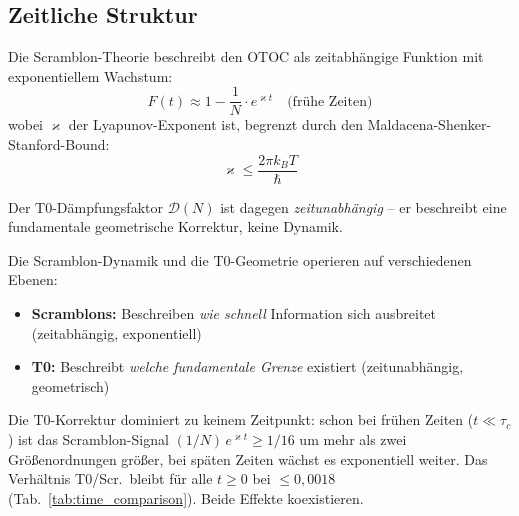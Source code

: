 \subsection{Zeitliche Struktur}

Die Scramblon-Theorie beschreibt den OTOC als zeitabhängige Funktion mit exponentiellem Wachstum:
\begin{equation}
	F(t) \approx 1 - \frac{1}{N} \cdot e^{\varkappa t} \quad \text{(frühe Zeiten)}
	\label{eq:otoc_scrambling}
\end{equation}
wobei $\varkappa$ der Lyapunov-Exponent ist, begrenzt durch den Maldacena-Shenker-Stanford-Bound:
\begin{equation}
	\varkappa \leq \frac{2\pi k_B T}{\hbar}
\end{equation}

Der T0-Dämpfungsfaktor $\mathcal{D}(N)$ ist dagegen \emph{zeitunabhängig} -- er beschreibt eine fundamentale geometrische Korrektur, keine Dynamik.

\begin{table}[h]
	\centering
	\caption{Zeitvergleich: Scramblon-OTOC-Abfall vs.\ statische T0-Korrektur ($N=16$, $\varkappa \cdot \tau_c \approx 1$)}
	\label{tab:time_comparison}
\end{table}

\begin{remark}[Komplementarität]
	Die Scramblon-Dynamik und die T0-Geometrie operieren auf verschiedenen Ebenen:
	\begin{itemize}
		\item \textbf{Scramblons:} Beschreiben \emph{wie schnell} Information sich ausbreitet (zeitabhängig, exponentiell)
		\item \textbf{T0:} Beschreibt \emph{welche fundamentale Grenze} existiert (zeitunabhängig, geometrisch)
	\end{itemize}
	Die T0-Korrektur dominiert zu keinem Zeitpunkt: schon bei frühen Zeiten ($t \ll \tau_c$) ist das Scramblon-Signal $(1/N)\,e^{\varkappa t} \geq 1/16$ um mehr als zwei Größenordnungen größer, bei späten Zeiten wächst es exponentiell weiter. Das Verhältnis T0/Scr.\ bleibt für alle $t \geq 0$ bei $\leq 0{,}0018$ (Tab.~\ref{tab:time_comparison}). Beide Effekte koexistieren.
\end{remark}

